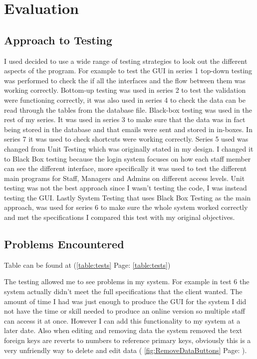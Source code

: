 \section{Evaluation}

\subsection{Approach to Testing}

I used decided to use a wide range of testing strategies to look out the different aspects of the program. For example to test the GUI in series 1 top-down testing was performed to check the if all the interfaces and the flow between them was working correctly. Bottom-up testing was used in series 2 to test the validation were functioning correctly, it was also used in series 4 to check the data can be read through the tables from the database file. Black-box testing was used in the rest of my series. It was used in series 3 to make sure that the data was in fact being stored in the database and that emails were sent and stored in in-boxes. In series 7 it was used to check shortcuts were working correctly. Series 5 used was changed from Unit Testing which was originally stated in my design. I changed it to Black Box testing because the login system focuses on how each staff member can see the different interface, more specifically it was used to test the different main programs for Staff, Managers and Admins on different access levels. Unit testing was not the best approach since I wasn't testing the code, I was instead testing the GUI. Lastly System Testing that uses Black Box Testing as the main approach, was used for series 6 to make sure the whole system worked correctly and met the specifications I compared this test with my original objectives.

\subsection{Problems Encountered}

Table can be found at (\ref{table:tests} Page: \ref{table:tests})

The testing allowed me to see problems in my system. For example in test 6 the system actually didn't meet the full specifications that the client wanted. The amount of time I had was just enough to produce the GUI for the system I did not have the time or skill needed to produce an online version so multiple staff can access it at once. However I can add this functionality to my system at a later date. Also when editing and removing data the system removed the text foreign keys are reverts to numbers to reference primary keys, obviously this is a very unfriendly way to delete and edit data ( \ref{fig:RemoveDataButtons} Page: \pageref{fig:RemoveDataButtons}).

